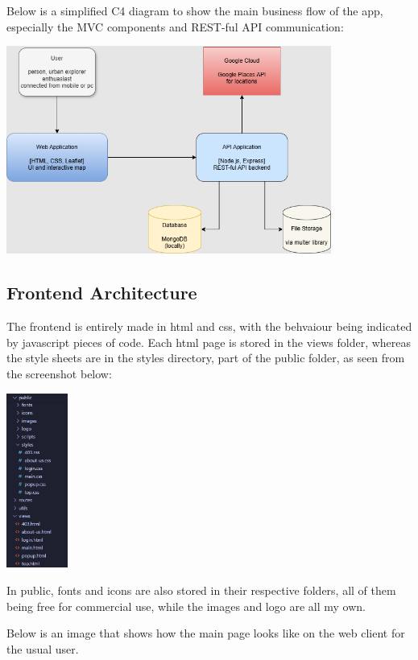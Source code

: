 \documentclass[12pt,a4paper]{report}
\begin{document}
Below is a simplified C4 diagram to show the main business flow of the app, especially the MVC components and REST-ful API communication:

\begin{center}
\includegraphics[width=0.8\textwidth]{images/licenta.drawio.png}
\end{center}

\subsection{Frontend Architecture}

The frontend is entirely made in html and css, with the behvaiour being indicated by javascript pieces of code. Each html page is stored in the views folder, whereas the style sheets are in the styles directory, part of the public folder, as seen from the screenshot below:

\includegraphics[width=0.15\textwidth]{images/front.png}

In public, fonts and icons are also stored in their respective folders, all of them being free for commercial use, while the images and logo are all my own.

Below is an image that shows how the main page looks like on the web client for the usual user.
\end{document}
